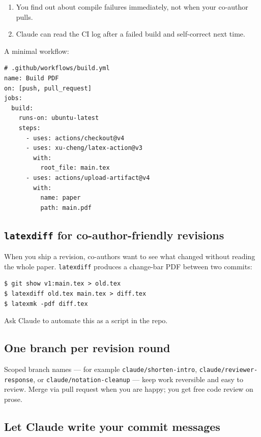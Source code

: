 \begin{enumerate}[leftmargin=*]
  \item You find out about compile failures immediately, not when your co-author pulls.
  \item Claude can read the CI log after a failed build and self-correct next time.
\end{enumerate}

A minimal workflow:

\begin{lstlisting}[style=shell]
# .github/workflows/build.yml
name: Build PDF
on: [push, pull_request]
jobs:
  build:
    runs-on: ubuntu-latest
    steps:
      - uses: actions/checkout@v4
      - uses: xu-cheng/latex-action@v3
        with:
          root_file: main.tex
      - uses: actions/upload-artifact@v4
        with:
          name: paper
          path: main.pdf
\end{lstlisting}

\subsection{\texttt{latexdiff} for co-author-friendly revisions}

When you ship a revision, co-authors want to see what changed without reading the whole paper. \verb|latexdiff| produces a change-bar PDF between two commits:

\begin{lstlisting}[style=shell]
$ git show v1:main.tex > old.tex
$ latexdiff old.tex main.tex > diff.tex
$ latexmk -pdf diff.tex
\end{lstlisting}

\noindent Ask Claude to automate this as a script in the repo.

\subsection{One branch per revision round}

Scoped branch names --- for example \verb|claude/shorten-intro|, \verb|claude/reviewer-response|, or \verb|claude/notation-cleanup| --- keep work reversible and easy to review. Merge via pull request when you are happy; you get free code review on prose.

\subsection{Let Claude write your commit messages}

